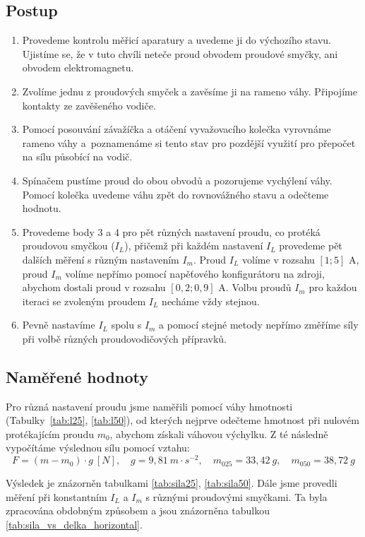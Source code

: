\documentclass[a4paper,12pt]{article}
\begin{document}
\subsection{Postup}
\begin{enumerate}
    \item Provedeme kontrolu měřicí aparatury a uvedeme ji do výchozího stavu. Ujistíme se, že v tuto chvíli neteče proud obvodem proudové smyčky, ani obvodem elektromagnetu.
    \item Zvolíme jednu z proudových smyček a zavěsíme ji na rameno váhy. Připojíme kontakty ze zavěšeného vodiče.
    \item Pomocí posouvání závažíčka a otáčení vyvažovacího kolečka vyrovnáme rameno váhy a~poznamenáme si tento stav pro pozdější využití pro přepočet na sílu působící na vodič.
    \item Spínačem pustíme proud do obou obvodů a pozorujeme vychýlení váhy. Pomocí kolečka uvedeme váhu zpět do rovnovážného stavu a odečteme hodnotu.
    \item Provedeme body 3 a 4 pro pět různých nastavení proudu, co protéká  proudovou smyčkou ($I_L$), přičemž při každém nastavení $I_L$ provedeme pět dalších měření s různým nastavením $I_m$. Proud $I_L$ volíme v rozsahu $[1;5]$ A, proud $I_m$ volíme nepřímo pomocí napěťového konfigurátoru na zdroji, abychom dostali proud v rozsahu $[0,2;0,9]$ A. Volbu proudů $I_m$ pro každou iteraci se zvoleným proudem $I_L$ necháme vždy stejnou.
    \item Pevně nastavíme $I_L$ spolu s $I_m$ a pomocí stejné metody nepřímo změříme síly při volbě různých proudovodičových přípravků.
\end{enumerate}

\subsection{Naměřené hodnoty}
Pro různá nastavení proudu jsme naměřili pomocí váhy hmotnosti (Tabulky~\ref{tab:l25}, \ref{tab:l50}), od kterých nejprve odečteme hmotnost při nulovém protékajícím proudu $m_0$, abychom získali váhovou výchylku. Z té následně vypočítáme výslednou sílu pomocí vztahu:
$$
F = (m - m_0) \cdot g\ [N],\quad g=9,81\ m \cdot s^{-2},\quad m_{025} = 33,42\ g,\quad m_{050} = 38,72\ g
$$

Výsledek je znázorněn tabulkami \ref{tab:sila25}, \ref{tab:sila50}. Dále jsme provedli měření při konstantním $I_L$ a $I_m$ s různými proudovými smyčkami. Ta byla zpracována obdobným způsobem a jsou znázorněna tabulkou \ref{tab:sila_vs_delka_horizontal}.
\end{document}
